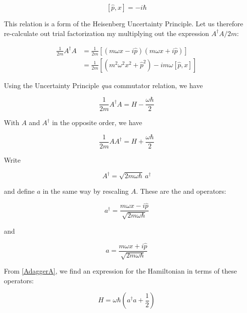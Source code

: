 \begin{equation}
\label{uncertainty_principle}
  \left[\hat p, x\right] = -i \hbar
\end{equation}


This relation is a form of the Heisenberg Uncertainty Principle.  
Let us therefore re-calculate out trial factorization my 
multiplying out the expression $A^\dagger A/2m$:

\begin{align}
\frac{1}{2m}A^\dagger A 
  &= \frac{1}{2m}\left[ (m\omega x - i\hat p)(m\omega x + i \hat p)\right] \\ 
  &= \frac{1}{2m}\left[ (m^2 \omega^2 x^2+ \hat p^2) - im\omega [\hat p, x] \right] 
\end{align}

Using the Uncertainty Principle \emph{qua} commutator relation, we have

\begin{equation}
\label{AdaggerA}
\frac{1}{2m}A^\dagger A = H - \frac{\omega\hbar}{2}
\end{equation}

With $A$ and $A^\dagger$ in the opposite order, we have

\begin{equation}
\label{AAdagger}
\frac{1}{2m}A A^\dagger = H + \frac{\omega\hbar}{2}
\end{equation}

Write

\begin{equation}
\label{hohamiltonian_number_operator}
A^\dagger = \sqrt{2m\omega\hbar}\, a^\dagger
\end{equation}

and define $a$ in the same way by rescaling  $A$. 
These are the   and  operators:

\begin{equation}
\label{creation_op}
a^\dagger = \frac{m\omega x - i\hat p}{\sqrt{2m\omega\hbar}}
\end{equation}

and 

\begin{equation}
\label{annihilation_op}
a = \frac{m\omega x + i\hat p}{\sqrt{2m\omega\hbar}}
\end{equation}

From \eqref{AdaggerA}, we find an expression for the Hamiltonian
in terms of these operators:


\begin{equation}
\label{hfactorplus}
H = \omega\hbar\left(a^\dagger a +  \frac{1}{2}\right)
\end{equation}

